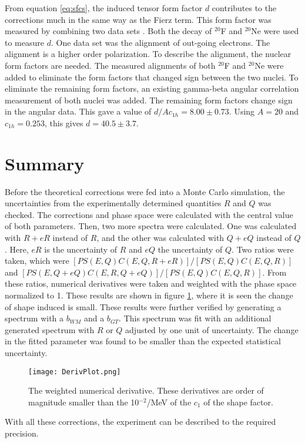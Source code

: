 \documentclass[../MaxHughesThesis.tex]{subfiles}
\begin{document}
From equation \ref{eq:sfcs}, the induced tensor form factor $d$ contributes to the corrections much in the same way as the Fierz term.
This form factor was measured by combining two data sets \cite{Min11}.
Both the decay of $^{20}$F and $^{20}$Ne were used to measure $d$.
One data set was the alignment of out-going electrons.
The alignment is a higher order polarization.
To describe the alignment, the nuclear form factors are needed.  
The measured alignments of both $^{20}$F and $^{20}$Ne were added to eliminate the form factors that changed sign between the two nuclei.
To eliminate the remaining form factors, an existing gamma-beta angular correlation measurement of both nuclei was added. 
The remaining form factors change sign in the angular data.
This gave a value of $d/Ac_{1h} = 8.00 \pm 0.73$.
Using $A = 20$ and $c_{1h} = 0.253$, this gives $d = 40.5 \pm 3.7$. 

\section{Summary}

Before the theoretical corrections were fed into a Monte Carlo simulation, the uncertainties from the experimentally determined quantities $R$ and $Q$ was checked.
The corrections and phase space were calculated with the central value of both parameters.
Then, two more spectra were calculated.
One was calculated with $R + eR$ instead of $R$, and the other was calculated with $Q + eQ$ instead of $Q$.
Here, $eR$ is the uncertainty of $R$ and $eQ$ the uncertainty of $Q$.
Two ratios were taken, which were $[PS(E,Q)C(E,Q,R+eR)]/[PS(E,Q)C(E,Q,R)]$ and $[PS(E,Q+eQ)C(E,R,Q+eQ)]/[PS(E,Q)C(E,Q,R)]$.
From these ratios, numerical derivatives were taken and weighted with the phase space normalized to 1.
These results are shown in figure \ref{fig:theoryuncer}, where it is seen the change of shape induced is small.
These results were further verified by generating a spectrum with a $b_{WM}$ and a $b_{GT}$.
This spectrum was fit with an additional generated spectrum with $R$ or $Q$ adjusted by one unit of uncertainty.
The change in the fitted parameter was found to be smaller than the expected statistical uncertainty.

\begin{figure}[!htb]
	\centerline{\texttt{[image: DerivPlot.png]}}
	\caption{The weighted numerical derivative.
		 These derivatives are order of magnitude smaller than the 10$^{-2}$/MeV of the $c_{1}$ of the shape factor.}
	\label{fig:theoryuncer}
\end{figure}
With all these corrections, the experiment can be described to the required precision.
\end{document}
